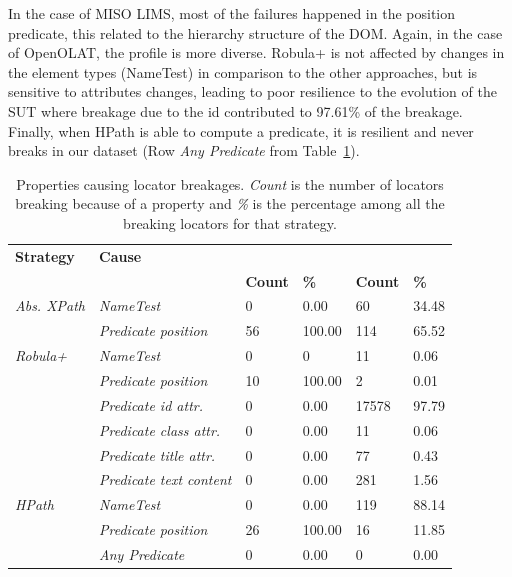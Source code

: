 In the case of MISO LIMS, most of the failures happened in the position predicate, this related to the hierarchy structure of the DOM. Again, in the case of OpenOLAT, the profile is more diverse. Robula+ is not affected by changes in the element types (NameTest) in comparison to the other approaches, but is sensitive to attributes changes, leading to poor resilience to the evolution of the SUT where breakage due to the id contributed to 97.61\% of the breakage. Finally, when HPath is able to compute a predicate, it is resilient and never breaks in our dataset (Row \emph{Any Predicate} from Table~\ref{tab:breakage_cause}).  

\begin{table}
\centering
\caption{Properties causing locator breakages. \emph{Count} is the number of locators breaking because of a property and \emph{\%} is the percentage among all the breaking locators for that strategy.}
\label{tab:breakage_cause}
\begin{tabular}{>{\raggedright}m{0.4in}>{\raggedright}m{0.8in}>{\raggedleft}m{0.25in} >{\raggedleft}m{0.2in}>{\raggedleft}m{0.4in} >{\raggedleft}m{0.2in}}
\toprule
\textbf{\scriptsize{Strategy}} & \textbf{\scriptsize{Cause}} & \multicolumn{2}{c}{\textbf{\scriptsize{MISO LIMS}}} & \multicolumn{2}{c}{\textbf{\scriptsize{OpenOLAT}}}\tabularnewline
 &   & \textbf{\scriptsize{Count}} & \textbf{\scriptsize{\%}} & \textbf{\scriptsize{Count}} & \textbf{\scriptsize{\%}}\tabularnewline
\toprule
\scriptsize{\textit{Abs. XPath}} & \scriptsize{\textit{NameTest}} & \scriptsize{0} & \scriptsize{0.00} & \scriptsize{60} & \scriptsize{34.48}\tabularnewline
 & \scriptsize{\textit{Predicate position}} & \scriptsize{56} & \scriptsize{100.00} & \scriptsize{114} & \scriptsize{65.52}\tabularnewline
 \hline
\scriptsize{\textit{Robula+}} & \scriptsize{\textit{NameTest}} & \scriptsize{0} & \scriptsize{0} & \scriptsize{11} & \scriptsize{0.06}\tabularnewline
 & \scriptsize{\textit{Predicate position}} & \scriptsize{10} & \scriptsize{100.00} & \scriptsize{2} & \scriptsize{0.01}\tabularnewline
 & \scriptsize{\textit{Predicate id attr.}} & \scriptsize{0} & \scriptsize{0.00} & \scriptsize{17578} & \scriptsize{97.79}\tabularnewline
 & \scriptsize{\textit{Predicate class attr.}} & \scriptsize{0} & \scriptsize{0.00} & \scriptsize{11} & \scriptsize{0.06}\tabularnewline
 & \scriptsize{\textit{Predicate title attr.}} & \scriptsize{0} & \scriptsize{0.00} & \scriptsize{77} & \scriptsize{0.43}\tabularnewline
 & \scriptsize{\textit{Predicate text content}} & \scriptsize{0} & \scriptsize{0.00} & \scriptsize{281} & \scriptsize{1.56}\tabularnewline
 \hline
\scriptsize{\textit{HPath}} & \scriptsize{\textit{NameTest}} & \scriptsize{0} & \scriptsize{0.00} & \scriptsize{119} & \scriptsize{88.14}\tabularnewline
 & \scriptsize{\textit{Predicate position}} & \scriptsize{26} & \scriptsize{100.00} & \scriptsize{16} & \scriptsize{11.85}\tabularnewline
 & \scriptsize{\textit{Any Predicate}} & \scriptsize{0} & \scriptsize{0.00} & \scriptsize{0} & \scriptsize{0.00}\tabularnewline
\bottomrule
\end{tabular}
\end{table}

